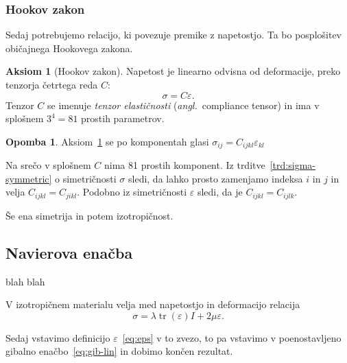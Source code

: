 \documentclass[12pt,a4paper]{article}
\theoremstyle{definition} %
\newtheorem{opomba}[definicija]{Opomba}
\newtheorem{aksiom}{Aksiom}
\theoremstyle{plain} %
\numberwithin{equation}{section}
\newcommand{\eps}{\varepsilon}
\newcommand{\ts}{\sigma}
\DeclareMathOperator{\tr}{tr}
\newcommand{\ang}[1]{(\textit{angl.}\ #1)}
\begin{document}
\subsubsection{Hookov zakon}
Sedaj potrebujemo relacijo, ki povezuje premike z napetostjo. Ta bo posplošitev
običajnega Hookovega zakona.

\begin{aksiom}[Hookov zakon]
  \label{aks:hook}
  Napetost je linearno odvisna od deformacije, preko tenzorja četrtega reda $C$:
  \[ \ts = C\eps. \]
  Tenzor $C$ se imenuje \emph{tenzor elastičnosti} \ang{compliance tensor} in ima v splošnem $3^4
  = 81$ prostih parametrov.
\end{aksiom}
\begin{opomba}
  Aksiom~\ref{aks:hook} se po komponentah glasi $\ts_{ij} = C_{ijkl}
  \eps_{kl}$
\end{opomba}

Na srečo v splošnem $C$ nima 81 prostih komponent.
Iz trditve~\ref{trd:sigma-symmetric} o simetričnosti $\ts$ sledi, da lahko
prosto zamenjamo indeksa $i$ in $j$ in velja $C_{ijkl} = C_{jikl}$.
Podobno iz simetričnosti $\eps$ sledi, da je $C_{ijkl} = C_{ijlk}$.


Še ena simetrija in potem izotropičnost.

\subsection{Navierova enačba}
blah blah


V izotropičnem materialu velja med napetostjo in deformacijo relacija
\[
  \ts = \lambda \tr(\eps)I + 2\mu \eps.
\]

Sedaj vstavimo definicijo $\eps$~\eqref{eq:eps} v to zvezo, to pa vstavimo v
poenostavljeno gibalno enačbo~\eqref{eq:gib-lin} in dobimo končen rezultat.
\end{document}
